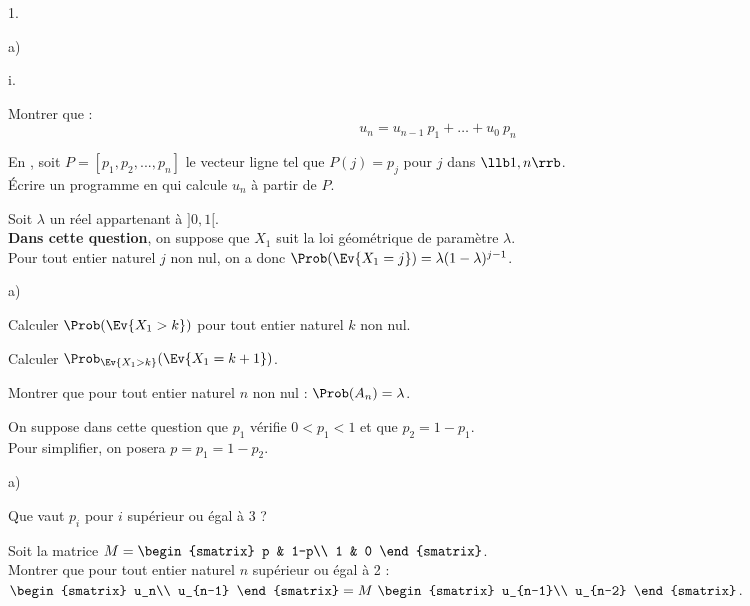 \begin{noliste}{1.}
\begin{noliste}{a)}
\begin{nonoliste}{i.}
    \end{nonoliste}

  \item Montrer que :
    \[
    u_n = u_{n-1} \ p_1 + \ldots + u_0 \ p_n
    \]
    
    

  \item En \Scilab{}, soit $P=[p_1,p_2,...,p_n]$ le vecteur ligne tel
    que $P(j)=p_j$ pour $j$ dans $\llb 1,n \rrb$.\\
    Écrire un programme en \Scilab{} qui calcule $u_n$ à partir de
    $P$.

    
\end{noliste}



  
\item Soit $\lambda$ un réel appartenant à $]0,1[$.\\[.2cm]
  \textbf{Dans cette question}, on suppose que $X_1$ suit la loi
  géométrique de paramètre $\lambda$.\\
  Pour tout entier naturel $j$ non nul, on a donc $\Prob(\Ev{X_1=j})=
  \lambda (1-\lambda)^{j-1}$.
  \begin{noliste}{a)}
  \item Calculer $\Prob(\Ev{X_1>k})$ pour tout entier naturel $k$ non nul.

    

  \item Calculer $\Prob_{\Ev{X_1 >k}}(\Ev{X_1=k+1})$.

    

  \item Montrer que pour tout entier naturel $n$ non nul : $\Prob(A_n)
    = \lambda$.

    
  \end{noliste}

\item On suppose dans cette question que $p_1$ vérifie $0<p_1<1$ et
  que $p_2 = 1 - p_1$.\\
  Pour simplifier, on posera $p = p_1 = 1 - p_2$.
  \begin{noliste}{a)}
  \item Que vaut $p_i$ pour $i$ supérieur ou égal à 3 ?

    




  \item Soit la matrice $M =
    \begin{smatrix}
      p & 1-p\\
      1 & 0 
    \end{smatrix}$.\\
    Montrer que pour tout entier naturel $n$ supérieur ou égal à 2 : $
    \begin{smatrix}
      u_n\\ 
      u_{n-1} 
    \end{smatrix}
    = M \ 
    \begin{smatrix}
      u_{n-1}\\
      u_{n-2} 
    \end{smatrix}
    $.


\end{noliste}
\end{noliste}
